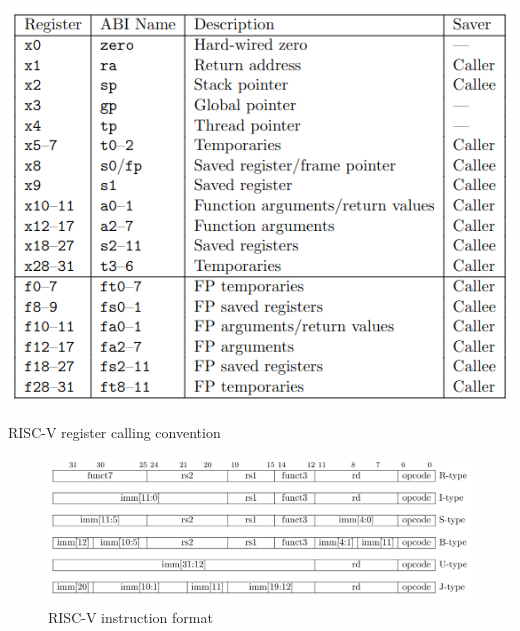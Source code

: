 \begin{table}
    \centering
    \includegraphics[width=.85\linewidth]{figures/RISCV_register_calling_convention.png}
    \caption{RISC-V register calling convention}
    \label{table:riscv_register_calling_convention}
\end{table}

\begin{figure}
    \centering
    \includegraphics[width=1\linewidth]{figures/RISCV_basic_instruction_format.png}
    \caption{RISC-V instruction format}
    \label{fig:riscv_base_instruction_format}
\end{figure}

